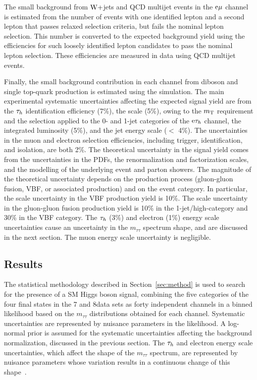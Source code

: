 \documentclass[12pt,twoside,a4paper,cmspaper,final,collab]{cms-tdr}
\begin{document}
The small background from $\mathrm{W}+$jets and QCD multijet events in the $\mathrm{e}{\mu}$
channel is estimated from the number of events with one identified lepton and a second lepton
that passes relaxed selection criteria, but fails the nominal lepton selection.
This number is converted to the expected background yield using the efficiencies
for such loosely identified lepton candidates to pass the nominal lepton selection. These efficiencies
are measured in data using QCD multijet events.

Finally, the small background contribution in each channel from diboson and single top-quark production is estimated using the simulation.
The main experimental systematic uncertainties affecting the expected signal yield are from the $\tau_h$ identification efficiency (7\%),
the \MET scale (5\%), owing to the $m_\mathrm{T}$ requirement and the \MET selection applied to the 0- and 1-jet categories of the $\mathrm{e}\tau_h$ channel,
the integrated luminosity (5\%), and the jet energy scale ($<$ 4\%).
The uncertainties in the muon and electron selection efficiencies, including trigger, identification, and isolation,
are both 2\%.
The theoretical uncertainty in the signal yield comes from the uncertainties in the PDFs,
the renormalization and factorization scales, and the modelling of the underlying event and parton showers.
The magnitude of the theoretical uncertainty depends on the production process (gluon-gluon fusion, VBF, or associated production)
and on the event category.
In particular, the scale uncertainty in the VBF production yield is 10\%.
The scale uncertainty in the gluon-gluon fusion production yield is 10\% in the 1-jet/high-\pt category
and 30\% in the VBF category.
The $\tau_h$ (3\%) and electron (1\%) energy scale uncertainties cause an uncertainty in the $m_{\tau\tau}$ spectrum shape, and are discussed in the next section.
The muon energy scale uncertainty is negligible.

\subsection{Results}

The statistical methodology described in Section~\ref{sec:method} is used to search for the presence of a SM Higgs boson signal,
combining the five categories of the four final states in the 7 and 8\TeV data sets as forty independent channels in a
binned likelihood based on the $m_{\tau\tau}$ distributions obtained for each channel.
Systematic uncertainties are represented by nuisance parameters in the likelihood.
A log-normal prior is assumed for the systematic uncertainties affecting the background normalization, discussed in the previous section.
The $\tau_h$ and electron energy scale uncertainties, which affect the shape of the $m_{\tau\tau}$
spectrum, are represented by nuisance parameters whose variation results in a
continuous change of this shape~\cite{Conway-PhyStat}.
\end{document}
